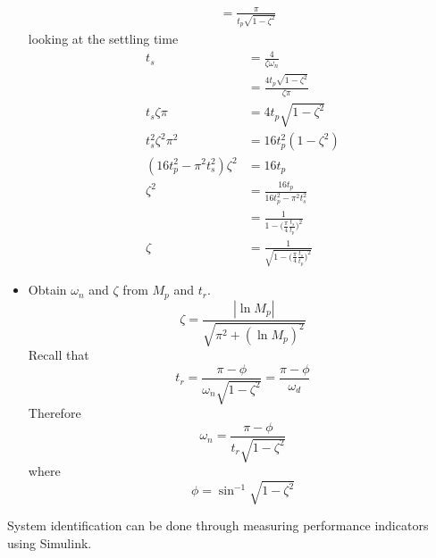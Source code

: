 \documentclass[12pt,letter]{article}
\numberwithin{ex}{section} %
\numberwithin{re}{section} %
\numberwithin{equation}{section}	%
\begin{document}
\begin{itemize}
\begin{align}
&= \frac{\pi}{t_p \sqrt{1-\zeta^2}} \nonumber 
\end{align}
looking at the settling time
\begin{align}
t_s &= \frac{4}{\zeta \omega_n}  \\
&= \frac{4 t_p \sqrt{1-\zeta^2}}{\zeta \pi} \nonumber \\
t_s \zeta \pi &= 4 t_p \sqrt{1-\zeta^2} \nonumber \\
t_s^2 \zeta^2 \pi^2 &= 16 t_p^2(1- \zeta^2) \nonumber \\
(16 t_p^2-\pi^2 t_s^2) \zeta^2 &= 16 t_p \nonumber \\
\zeta^2 &= \frac{16 t_p}{16 t_p^2-\pi^2 t_s^2} \nonumber \\
 &= \frac{1}{1-\big(\frac{\pi}{4}\frac{t_s}{t_p}\big)^2} \nonumber \\
\zeta &= \frac{1}{\sqrt{1-\big(\frac{\pi}{4}\frac{t_s}{t_p}\big)^2}} \nonumber 
\end{align}
\item Obtain $\omega_n$ and $\zeta$ from $M_p$ and $t_r$.  
\begin{equation}
\zeta = \frac{|\ln M_p|}{\sqrt{\pi^2 + (\ln M_p)^2}}
\end{equation}
Recall that 
\begin{equation}
t_r = \frac{\pi - \phi}{\omega_n \sqrt{1-\zeta^2}} = \frac{\pi - \phi}{\omega_d}
\end{equation}
Therefore
\begin{equation}
\omega_n = \frac{\pi - \phi}{t_r \sqrt{1-\zeta^2}}
\end{equation}
where 
\begin{equation}
\phi = \sin^{-1} \sqrt{1-\zeta^2}
\end{equation}
\end{itemize}



System identification can be done through measuring performance indicators using Simulink.
\end{document}
